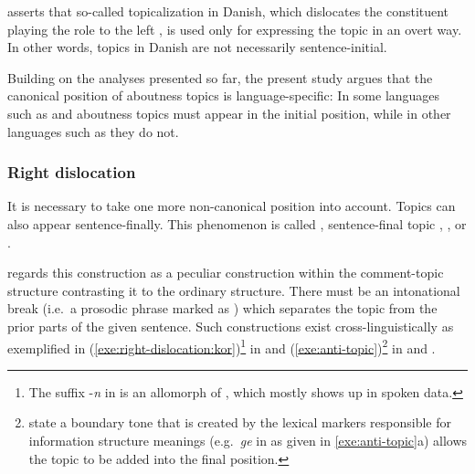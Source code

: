 \noindent \citeauthor{erteschik:07} asserts that so-called
topicalization in Danish, which dislocates the constituent playing the
 role to the left , is used only for
expressing the topic in an overt way.  In other words, topics in
Danish are not necessarily sentence-initial.




Building on the analyses presented so far, the present study argues
that the canonical position of aboutness topics is language-specific:
In some languages such as  and  aboutness topics must
appear in the initial position, while in other languages such as
 they do not.






























\subsubsection{Right dislocation}
\label{4:sssec:right-dislocation}

It is necessary to take one more non-canonical  position into
account. Topics can also appear sentence-finally. This phenomenon is
called  \citep{cecchetto:99,law:03}, sentence-final
topic \citep{fery:krifka:08}, 
\citep{chafe:76,lambrecht:96}, or  \citep{kim:11}.


  


\noindent \citet{gundel:88} regards this construction as a peculiar
construction within the comment-topic structure contrasting it to the
ordinary  structure.  There must be an intonational break
(i.e.\ a prosodic phrase marked as ) which separates the
topic from the prior parts of the given sentence. Such constructions
exist cross-linguistically as exemplified in
(\ref{exe:right-dislocation:kor})\footnote{The suffix -\textit{n} in
   is an allomorph of \nun, which
  mostly shows up in spoken data.} in  and
(\ref{exe:anti-topic})\footnote{\citet{fery:krifka:08} state a
  boundary tone that is created by the lexical markers responsible for
  information structure meanings (e.g.\ \textit{ge} in 
  as given in \ref{exe:anti-topic}a) allows the topic to be added
  into the final position.} in  and
.


